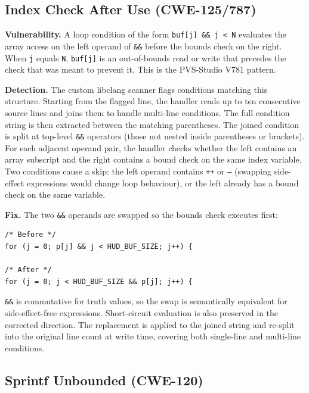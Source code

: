 \subsection{Index Check After Use (CWE-125/787)}

\textbf{Vulnerability.} A loop condition of the form \texttt{buf[j] \&\& j < N} evaluates the array access on the left operand of \texttt{\&\&} before the bounds check on the right. When \texttt{j} equals \texttt{N}, \texttt{buf[j]} is an out-of-bounds read or write that precedes the check that was meant to prevent it. This is the PVS-Studio V781 pattern.

\textbf{Detection.} The custom libclang scanner flags conditions matching this structure. Starting from the flagged line, the handler reads up to ten consecutive source lines and joins them to handle multi-line conditions. The full condition string is then extracted between the matching parentheses. The joined condition is split at top-level \texttt{\&\&} operators (those not nested inside parentheses or brackets). For each adjacent operand pair, the handler checks whether the left contains an array subscript and the right contains a bound check on the same index variable. Two conditions cause a skip: the left operand contains \texttt{++} or \texttt{--} (swapping side-effect expressions would change loop behaviour), or the left already has a bound check on the same variable.

\textbf{Fix.} The two \texttt{\&\&} operands are swapped so the bounds check executes first:

\begin{lstlisting}[caption={CWE-125/787 fix: operand swap in loop condition}]
/* Before */
for (j = 0; p[j] && j < HUD_BUF_SIZE; j++) {

/* After */
for (j = 0; j < HUD_BUF_SIZE && p[j]; j++) {
\end{lstlisting}

\texttt{\&\&} is commutative for truth values, so the swap is semantically equivalent for side-effect-free expressions. Short-circuit evaluation is also preserved in the corrected direction. The replacement is applied to the joined string and re-split into the original line count at write time, covering both single-line and multi-line conditions.

\subsection{Sprintf Unbounded (CWE-120)}

